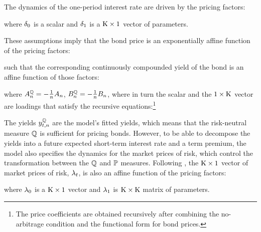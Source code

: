 {The dynamics of the one-period interest rate are driven by the pricing factors: 
	
\noindent where \(\delta_{0}\) is a scalar and \(\delta_{1}\) is a \(\mathrm{K} \times 1\) vector of parameters.

These assumptions imply that the bond price is an exponentially affine function of the pricing factors:
	
\noindent such that the corresponding continuously compounded yield of the bond is an affine function of those factors:
	
\noindent where \(A_{n}^{\mathbb{Q}} = - \frac{1}{n} A_{n}\), \(B_{n}^{\mathbb{Q}} = - \frac{1}{n} B_{n}\), where in turn the scalar  and the \(1 \times \mathrm{K}\) vector  are loadings that satisfy the recursive equations:\footnote{ The price coefficients are obtained recursively after combining the no-arbitrage condition and the functional form for bond prices.}
	
	\vspace{-.7cm}
	
The yields \(y_{t,n}^{\mathbb{Q}}\) are the model's fitted yields, which means that the risk-neutral measure \(\mathbb{Q}\) is sufficient for pricing bonds. 
However, to be able to decompose the yields into a future expected short-term interest rate and a term premium, the model also specifies the dynamics for the market prices of risk, which control the transformation between the \(\mathbb{Q}\) and \(\mathbb{P}\) measures. 
Following \cite{Duffee:2002}, the \(\mathrm{K} \times 1\) vector of market prices of risk, \(\lambda_{t}\), is also an affine function of the pricing factors:
	
\noindent where \(\lambda_{0}\) is a \(\mathrm{K} \times 1\) vector and \(\lambda_{1}\) is \(\mathrm{K} \times \mathrm{K}\) matrix of parameters.

}
